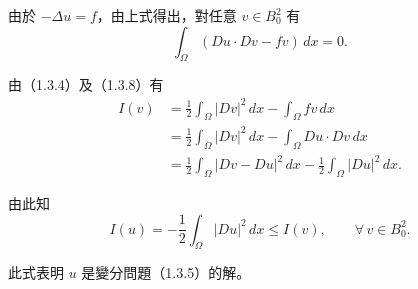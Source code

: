 \documentclass[11pt,a4paper,twoside]{article}
\newif\ifstudynotes
\newcommand{\StudyNote}[2]{%
    \ifstudynotes
    \begin{studyNote}[title={#1}]
    #2
    \end{studyNote}
    \fi
}
\newcommand{\ImportantNote}[2]{%
    \ifstudynotes
    \begin{importantNote}[title={#1}]
    #2
    \end{importantNote}
    \fi
}
\newcommand{\pnum}[1]{%
    \makebox[0pt][r]{%
        \scriptsize\textbf{[#1]}\hspace{0.7em}%
    }%
}
\begin{document}
\noindent
\pnum{19}
由於 $-\Delta u=f$，由上式得出，對任意 $v\in B_0^2$ 有
\begin{equation}
    \int_{\Omega}
    \left(
    Du\cdot Dv-fv
    \right)\,dx
    =
    0.
    \tag{1.3.8}
\end{equation}

\ImportantNote{重要觀念：式（1.3.8）在說什麼？}{
    因為 $v\in B_0^2$，所以
    \[
        v=0\qquad\text{在 }\partial\Omega\text{ 上}.
    \]
    因此 Green 公式中的邊界項
    \[
        \int_{\partial\Omega}
        v\frac{\partial u}{\partial\nu}\,ds
    \]
    直接消失。

    再利用
    \[
        -\Delta u=f
        \quad\Longleftrightarrow\quad
        \Delta u=-f,
    \]
    便得到
    \[
        \int_\Omega(Du\cdot Dv-fv)\,dx=0.
    \]

    這個式子已經開始具有「弱形式」的味道：
    原本的二階導數 $\Delta u$ 經由分部積分，被轉成只含一階導數的
    $Du\cdot Dv$。
    這個技巧之後會成為弱解與 Sobolev 空間的核心。
}


\newpage

\noindent
\pnum{20}
由（1.3.4）及（1.3.8）有
\begin{equation}
    \begin{aligned}
        I(v)
         & =
        \frac{1}{2}\int_{\Omega}|Dv|^2\,dx
        -
        \int_{\Omega}fv\,dx
        \\
         & =
        \frac{1}{2}\int_{\Omega}|Dv|^2\,dx
        -
        \int_{\Omega}Du\cdot Dv\,dx
        \\
         & =
        \frac{1}{2}\int_{\Omega}|Dv-Du|^2\,dx
        -
        \frac{1}{2}\int_{\Omega}|Du|^2\,dx.
    \end{aligned}
    \tag{1.3.9}
\end{equation}

\noindent
\pnum{21}
由此知
\[
    I(u)
    =
    -\frac{1}{2}\int_{\Omega}|Du|^2\,dx
    \leq I(v),
    \qquad
    \forall\,v\in B_0^2.
\]

此式表明 $u$ 是變分問題（1.3.5）的解。


\StudyNote{複習註解：為什麼這表示 $u$ 是變分問題的解？}{
    由（1.3.9）可改寫成
    \[
        I(v)
        =
        I(u)
        +
        \frac12\int_{\Omega}|Dv-Du|^2\,dx.
    \]
    因為平方恆非負，
    \[
        \frac12\int_{\Omega}|Dv-Du|^2\,dx\ge0,
    \]
    所以對所有 $v\in B_0^2$ 都有
    \[
        I(v)\ge I(u).
    \]
    也就是
    \[
        \boxed{
            I(u)=\min_{v\in B_0^2}I(v)
        }.
    \]
    因此 $u$ 正是變分問題（1.3.5）的解。

    可類比普通微積分：
    \[
        f(x)=c+x^2\ge c=f(0).
    \]
    在變分法中，只是把「數 $x$」換成「函數 $v$」。
}
\end{document}
